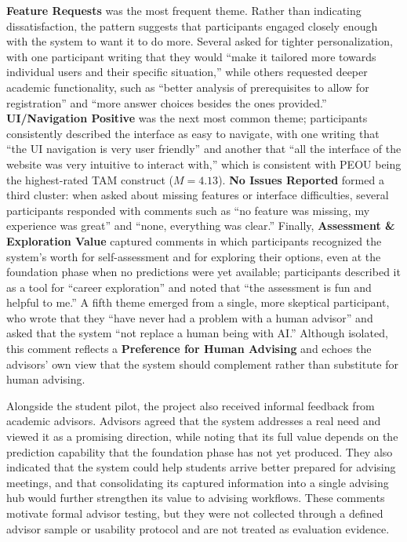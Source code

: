\documentclass[letterpaper,11pt]{article}
\begin{document}
\textbf{Feature Requests} was the most frequent theme. Rather than indicating dissatisfaction, the pattern suggests that participants engaged closely enough with the system to want it to do more. Several asked for tighter personalization, with one participant writing that they would ``make it tailored more towards individual users and their specific situation,'' while others requested deeper academic functionality, such as ``better analysis of prerequisites to allow for registration'' and ``more answer choices besides the ones provided.'' \textbf{UI/Navigation Positive} was the next most common theme; participants consistently described the interface as easy to navigate, with one writing that ``the UI navigation is very user friendly'' and another that ``all the interface of the website was very intuitive to interact with,'' which is consistent with PEOU being the highest-rated TAM construct ($M=4.13$). \textbf{No Issues Reported} formed a third cluster: when asked about missing features or interface difficulties, several participants responded with comments such as ``no feature was missing, my experience was great'' and ``none, everything was clear.'' Finally, \textbf{Assessment \& Exploration Value} captured comments in which participants recognized the system's worth for self-assessment and for exploring their options, even at the foundation phase when no predictions were yet available; participants described it as a tool for ``career exploration'' and noted that ``the assessment is fun and helpful to me.'' A fifth theme emerged from a single, more skeptical participant, who wrote that they ``have never had a problem with a human advisor'' and asked that the system ``not replace a human being with AI.'' Although isolated, this comment reflects a \textbf{Preference for Human Advising} and echoes the advisors' own view that the system should complement rather than substitute for human advising.

Alongside the student pilot, the project also received informal feedback from academic advisors. Advisors agreed that the system addresses a real need and viewed it as a promising direction, while noting that its full value depends on the prediction capability that the foundation phase has not yet produced. They also indicated that the system could help students arrive better prepared for advising meetings, and that consolidating its captured information into a single advising hub would further strengthen its value to advising workflows. These comments motivate formal advisor testing, but they were not collected through a defined advisor sample or usability protocol and are not treated as evaluation evidence.
\end{document}
